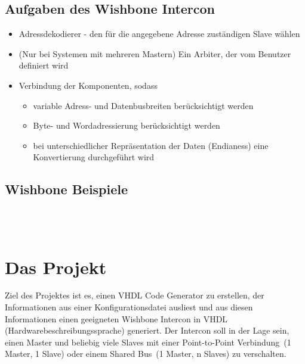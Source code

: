 \documentclass{article}
\begin{document}
\subsection{Aufgaben des Wishbone Intercon}
\begin{itemize}
\item Adressdekodierer - den für die angegebene Adresse zuständigen Slave wählen
\item (Nur bei Systemen mit mehreren Mastern) Ein Arbiter, der vom Benutzer definiert wird
\item Verbindung der Komponenten, sodass
\begin{itemize}
\item variable Adress- und Datenbusbreiten berücksichtigt werden
\item Byte- und Wordadressierung berücksichtigt werden
\item bei unterschiedlicher Repräsentation der Daten (Endianess) eine Konvertierung durchgeführt wird
\end{itemize}
\end{itemize}
\subsection{Wishbone Beispiele}

\noindent
{}
\\\\
\noindent
{}

\section{Das Projekt}
Ziel des Projektes ist es, einen VHDL Code Generator zu erstellen,
der Informationen aus einer Konfigurationsdatei ausliest und aus
diesen Informationen einen geeigneten Wishbone Intercon in VHDL (Hardwarebeschreibungssprache) generiert.
Der Intercon soll in der Lage sein, einen Master und beliebig viele Slaves mit einer \glqq Point-to-Point Verbindung\grqq\ (1 Master, 1 Slave) oder einem \glqq Shared Bus\grqq\ (1 Master, n Slaves) zu verschalten.
\end{document}
